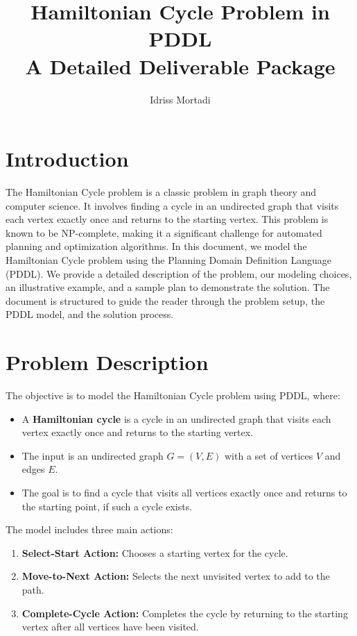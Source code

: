 \documentclass[a4paper,11pt]{article}
\title{Hamiltonian Cycle Problem in PDDL \\ \large A Detailed Deliverable Package}
\author{Idriss Mortadi}
\date{}
\begin{document}
\maketitle

\tableofcontents
\newpage

\section{Introduction}
The Hamiltonian Cycle problem is a classic problem in graph theory and computer science. It involves finding a cycle in an undirected graph that visits each vertex exactly once and returns to the starting vertex. This problem is known to be NP-complete, making it a significant challenge for automated planning and optimization algorithms. In this document, we model the Hamiltonian Cycle problem using the Planning Domain Definition Language (PDDL). We provide a detailed description of the problem, our modeling choices, an illustrative example, and a sample plan to demonstrate the solution. The document is structured to guide the reader through the problem setup, the PDDL model, and the solution process.

\section{Problem Description}
The objective is to model the Hamiltonian Cycle problem using PDDL, where:
\begin{itemize}
    \item A \textbf{Hamiltonian cycle} is a cycle in an undirected graph that visits each vertex exactly once and returns to the starting vertex.
    \item The input is an undirected graph $G = (V, E)$ with a set of vertices $V$ and edges $E$.
    \item The goal is to find a cycle that visits all vertices exactly once and returns to the starting point, if such a cycle exists.
\end{itemize}
The model includes three main actions:
\begin{enumerate}
    \item \textbf{Select-Start Action:} Chooses a starting vertex for the cycle.
    \item \textbf{Move-to-Next Action:} Selects the next unvisited vertex to add to the path.
    \item \textbf{Complete-Cycle Action:} Completes the cycle by returning to the starting vertex after all vertices have been visited.
\end{enumerate}
\end{document}
